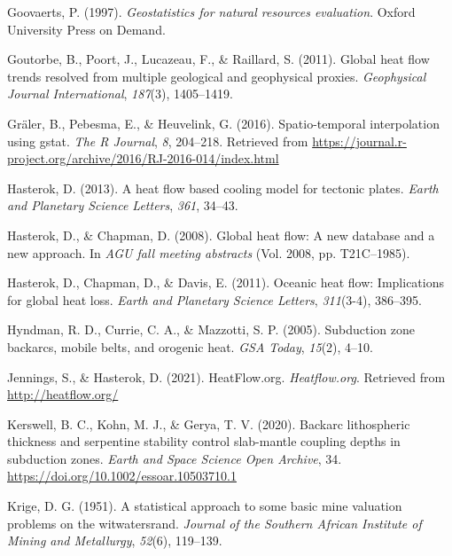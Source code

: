 \documentclass[draft,linenumbers]{agujournal2018}
\begin{document}
\leavevmode{}%
Goovaerts, P. (1997). \emph{Geostatistics for natural resources
evaluation}. Oxford University Press on Demand.

\leavevmode{}%
Goutorbe, B., Poort, J., Lucazeau, F., \& Raillard, S. (2011). Global
heat flow trends resolved from multiple geological and geophysical
proxies. \emph{Geophysical Journal International}, \emph{187}(3),
1405--1419.

\leavevmode{}%
Gräler, B., Pebesma, E., \& Heuvelink, G. (2016). Spatio-temporal
interpolation using gstat. \emph{The R Journal}, \emph{8}, 204--218.
Retrieved from
\url{https://journal.r-project.org/archive/2016/RJ-2016-014/index.html}

\leavevmode{}%
Hasterok, D. (2013). A heat flow based cooling model for tectonic
plates. \emph{Earth and Planetary Science Letters}, \emph{361}, 34--43.

\leavevmode{}%
Hasterok, D., \& Chapman, D. (2008). Global heat flow: A new database
and a new approach. In \emph{AGU fall meeting abstracts} (Vol. 2008, pp.
T21C--1985).

\leavevmode{}%
Hasterok, D., Chapman, D., \& Davis, E. (2011). Oceanic heat flow:
Implications for global heat loss. \emph{Earth and Planetary Science
Letters}, \emph{311}(3-4), 386--395.

\leavevmode{}%
Hyndman, R. D., Currie, C. A., \& Mazzotti, S. P. (2005). Subduction
zone backarcs, mobile belts, and orogenic heat. \emph{GSA Today},
\emph{15}(2), 4--10.

\leavevmode{}%
Jennings, S., \& Hasterok, D. (2021). HeatFlow.org. \emph{Heatflow.org}.
Retrieved from \url{http://heatflow.org/}

\leavevmode{}%
Kerswell, B. C., Kohn, M. J., \& Gerya, T. V. (2020). Backarc
lithospheric thickness and serpentine stability control slab-mantle
coupling depths in subduction zones. \emph{Earth and Space Science Open
Archive}, 34. \url{https://doi.org/10.1002/essoar.10503710.1}

\leavevmode{}%
Krige, D. G. (1951). A statistical approach to some basic mine valuation
problems on the witwatersrand. \emph{Journal of the Southern African
Institute of Mining and Metallurgy}, \emph{52}(6), 119--139.
\end{document}
